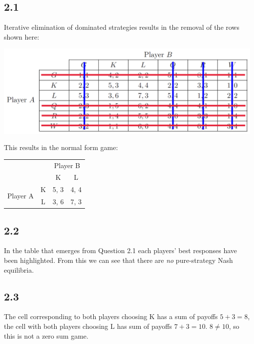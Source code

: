 \documentclass{article}
\begin{document}
\subsection*{2.1} Iterative elimination of dominated strategies results in the removal of the rows shown here:
\begin{center}
    \includegraphics[width=0.7\linewidth]{iterative-elimination.png}
\end{center}
This results in the normal form game:
\begin{table}[h!]
    \centering
    \begin{tabular}{cccc}
                                                   &                        & \multicolumn{2}{c}{Player B}                          \\ \cline{3-4} 
                                                   & \multicolumn{1}{c|}{}  & \multicolumn{1}{c|}{K}    & \multicolumn{1}{c|}{L}    \\ \cline{2-4} 
    \multicolumn{1}{c|}{\multirow{2}{*}{Player A}} & \multicolumn{1}{c|}{K} & \multicolumn{1}{c|}{{\color{red}5}, 3} & \multicolumn{1}{c|}{4, {\color{blue}4}} \\ \cline{2-4} 
    \multicolumn{1}{c|}{}                          & \multicolumn{1}{c|}{L} & \multicolumn{1}{c|}{3, {\color{blue}6}} & \multicolumn{1}{c|}{{\color{red}7}, 3} \\ \cline{2-4} 
    \end{tabular}
\end{table}

\subsection*{2.2}
In the table that emerges from Question 2.1 each players' best responses have been highlighted. From this we can see that there are \textit{no} pure-strategy Nash equilibria.

\subsection*{2.3}
The cell corresponding to both players choosing K has a sum of payoffs $5+3 = 8$, the cell with both players choosing L has sum of payoffs $7+3 = 10$. $8 \neq 10$, so this is not a zero sum game.
\end{document}

